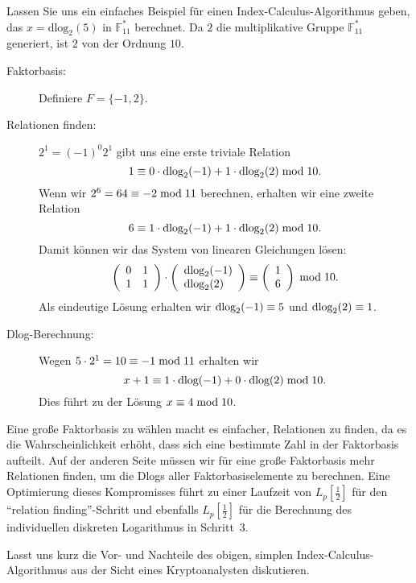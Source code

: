 \begin{refsegment}
Lassen Sie uns ein einfaches Beispiel für einen Index-Calculus-Algorithmus geben, das $x=\textrm{dlog}_2(5)$ in $\mathbb{F}_{11}^*$ berechnet. Da $2$ die multiplikative Gruppe $\mathbb{F}_{11}^*$ generiert, ist $2$ von der Ordnung $10$.

\begin{description}
\item[Faktorbasis:] Definiere $F=\{-1,2\}$.

\item[Relationen finden:] $2^1 = (-1)^0 2^1$ gibt uns eine erste triviale Relation
$$
  1 \equiv 0 \cdot \textrm{dlog}_2(-1) + 1\cdot \textrm{dlog}_2(2) \hspace{1mm}{\rm mod}\hspace{1mm} 10.
$$
Wenn wir $2^6 = 64 \equiv -2 \hspace{1mm}{\rm mod}\hspace{1mm} 11$ berechnen, erhalten wir eine zweite Relation
$$
  6 \equiv 1\cdot \textrm{dlog}_2(-1) + 1 \cdot \textrm{dlog}_2(2) \hspace{1mm}{\rm mod}\hspace{1mm} 10.
$$
Damit können wir das System von linearen Gleichungen lösen:
$$
\left(
\begin{array}{ll}
0 & 1\\
1 & 1
\end{array}
\right)
\cdot
\left(
\begin{array}{l}
\dlog_2(-1)\\
\dlog_2(2)
\end{array}
\right)
%
\equiv
%
\left(
\begin{array}{l}
1\\
6
\end{array}
\right) \mmod 10.
$$
Als eindeutige Lösung erhalten wir $\textrm{dlog}_2(-1) \equiv 5$ und $\textrm{dlog}_2(2) \equiv 1$.

\item[Dlog-Berechnung:] Wegen $5 \cdot 2^{1} = 10 \equiv -1 \hspace{1mm}{\rm mod}\hspace{1mm} 11$ erhalten wir
$$
  x + 1 \equiv 1 \cdot \textrm{dlog}(-1) + 0 \cdot \textrm{dlog}(2) \hspace{1mm}{\rm mod}\hspace{1mm} 10.
$$
Dies führt zu der Lösung $x \equiv 4 \hspace{1mm}{\rm mod}\hspace{1mm} 10$.
\end{description}

Eine große Faktorbasis zu wählen macht es einfacher, Relationen zu finden, da es die Wahrscheinlichkeit erhöht, dass sich eine bestimmte Zahl in der Faktorbasis aufteilt. Auf der anderen Seite müssen wir für eine große Faktorbasis mehr Relationen finden, um die Dlogs aller Faktorbasiselemente zu berechnen. Eine Optimierung dieses Kompromisses führt zu einer Laufzeit von $L_p[\frac 1 2]$ für den "`relation finding"'-Schritt und ebenfalls $L_p[\frac 1 2]$ für die Berechnung des individuellen diskreten Logarithmus in Schritt~3.

Lasst uns kurz die Vor- und Nachteile des obigen, simplen Index-Calculus-Algorithmus aus der Sicht eines Kryptoanalysten diskutieren.


\end{refsegment}
